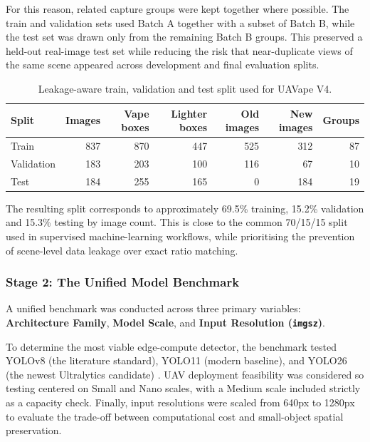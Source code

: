 For this reason, related capture groups were kept together where possible. The train and validation sets used Batch A together with a subset of Batch B, while the test set was drawn only from the remaining Batch B groups. This preserved a held-out real-image test set while reducing the risk that near-duplicate views of the same scene appeared across development and final evaluation splits.

\begin{table}[H]
\centering
\small
\begin{tabularx}{\textwidth}{l r r r r r r}
\toprule
\textbf{Split} & \textbf{Images} & \textbf{Vape boxes} & \textbf{Lighter boxes} & \textbf{Old images} & \textbf{New images} & \textbf{Groups} \\
\midrule
Train & 837 & 870 & 447 & 525 & 312 & 87 \\
Validation & 183 & 203 & 100 & 116 & 67 & 10 \\
Test & 184 & 255 & 165 & 0 & 184 & 19 \\
\bottomrule
\end{tabularx}
\caption{Leakage-aware train, validation and test split used for UAVape V4.}
\label{tab:uavape_results_split}
\end{table}

The resulting split corresponds to approximately 69.5\% training, 15.2\% validation and 15.3\% testing by image count. This is close to the common 70/15/15 split used in supervised machine-learning workflows, while prioritising the prevention of scene-level data leakage over exact ratio matching.

\subsubsection{Stage 2: The Unified Model Benchmark}
A unified benchmark was conducted across three primary variables: \textbf{Architecture Family}, \textbf{Model Scale}, and \textbf{Input Resolution (\texttt{imgsz})}.

To determine the most viable edge-compute detector, the benchmark tested YOLOv8 (the literature standard), YOLO11 (modern baseline), and YOLO26 (the newest Ultralytics candidate) \cite{ultralytics_yolov8_docs,ultralytics_yolo11_docs,ultralytics_platform_docs}. UAV deployment feasibility was considered so testing centered on Small and Nano scales, with a Medium scale included strictly as a capacity check. Finally, input resolutions were scaled from 640px to 1280px to evaluate the trade-off between computational cost and small-object spatial preservation. 


